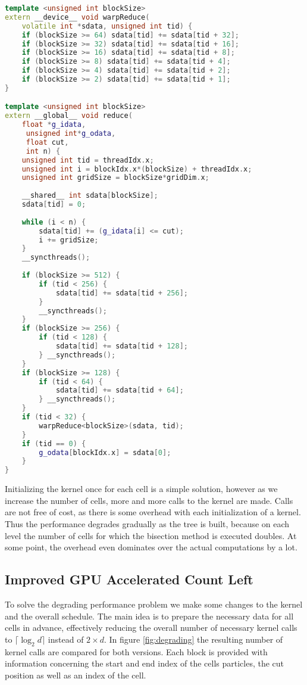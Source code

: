 \documentclass[]{article}
\begin{document}
\begin{lstlisting}[language=c++, caption=Conditional Reduction in CUDA, label=cuda:reduction]
template <unsigned int blockSize>
extern __device__ void warpReduce(
	volatile int *sdata, unsigned int tid) {
	if (blockSize >= 64) sdata[tid] += sdata[tid + 32];
	if (blockSize >= 32) sdata[tid] += sdata[tid + 16];
	if (blockSize >= 16) sdata[tid] += sdata[tid + 8];
	if (blockSize >= 8) sdata[tid] += sdata[tid + 4];
	if (blockSize >= 4) sdata[tid] += sdata[tid + 2];
	if (blockSize >= 2) sdata[tid] += sdata[tid + 1];
}

template <unsigned int blockSize>
extern __global__ void reduce(
	float *g_idata,
	 unsigned int*g_odata, 
	 float cut, 
	 int n) {
	unsigned int tid = threadIdx.x;
	unsigned int i = blockIdx.x*(blockSize) + threadIdx.x;
	unsigned int gridSize = blockSize*gridDim.x;
	
	__shared__ int sdata[blockSize];
	sdata[tid] = 0;
	
	while (i < n) {
		sdata[tid] += (g_idata[i] <= cut);
		i += gridSize;
	}
	__syncthreads();
	
	if (blockSize >= 512) {
		if (tid < 256) {
			sdata[tid] += sdata[tid + 256];
		}
		__syncthreads();
	}
	if (blockSize >= 256) {
		if (tid < 128) {
			sdata[tid] += sdata[tid + 128];
		} __syncthreads();
	}
	if (blockSize >= 128) {
		if (tid < 64) {
			sdata[tid] += sdata[tid + 64];
		} __syncthreads();
	}
	if (tid < 32) {
		warpReduce<blockSize>(sdata, tid);
	}
	if (tid == 0) {
		g_odata[blockIdx.x] = sdata[0];
	}
}
\end{lstlisting}



Initializing the kernel once for each cell is a simple solution, however as we increase the number of cells, more and more calls to the kernel are made. Calls are not free of cost, as there is some overhead with each initialization of a kernel. Thus the performance degrades gradually as the tree is built, because on each level the number of cells for which the bisection method is executed doubles. At some point, the overhead even dominates over the actual computations by a lot. 


\subsection{Improved GPU Accelerated Count Left} \label{imprctl}

To solve the degrading performance problem we make some changes to the kernel and the overall schedule. The main idea is to prepare the necessary data for all cells in advance, effectively reducing the overall number of necessary kernel calls to $\lceil \log_2 d \rceil $ instead of $2 \times d$. In figure \ref{fig:degrading} the resulting number of kernel calls are compared for both versions. Each block is provided with information concerning the start and end index of the cells particles, the cut position as well as an index of the cell. 
\end{document}
